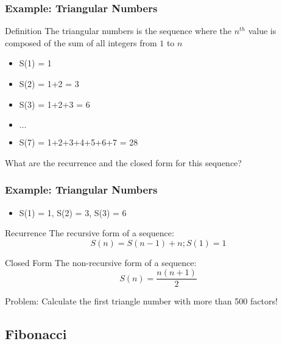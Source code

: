 \begin{frame}
  \frametitle{Example: Triangular Numbers}
  {\smaller
  \begin{block}{Definition}
    The triangular numbers is the sequence where the $n^{th}$ value is
    composed of the sum of all integers from $1$ to $n$
  \end{block}

  \begin{itemize}
  \item S(1) = 1
  \item S(2) = 1+2 = 3
  \item S(3) = 1+2+3 = 6
  \item $\ldots$
  \item S(7) = 1+2+3+4+5+6+7 = 28
  \end{itemize}
  }

  What are the recurrence and the closed form for this sequence?
\end{frame}

\begin{frame}
  \frametitle{Example: Triangular Numbers}
  {\smaller
    \begin{itemize}
    \item S(1) = 1, S(2) = 3, S(3) = 6
    \end{itemize}

    \begin{block}{Recurrence}
      The recursive form of a sequence:
      \begin{equation*}
        S(n) = S(n-1)+n; S(1) = 1
      \end{equation*}
    \end{block}
    \begin{block}{Closed Form}
      The non-recursive form of a sequence:
      \begin{equation*}
        S(n) = \frac{n(n+1)}{2}
      \end{equation*}
    \end{block}
    \alert{Problem:} Calculate the first triangle number with more
    than 500 factors!  }
\end{frame}

\subsection{Fibonacci}


